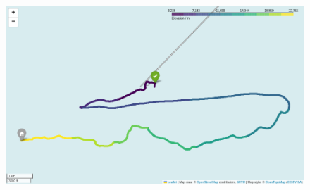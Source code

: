 \documentclass[11pt,a4paper,faculty=we,language=en,doctype=report]{cls/ugent-doc}
\begin{document}
\begin{figure}
	\includegraphics[width=\textwidth]{WeatherBalloonPath.png}
\end{figure}

\newpage


\end{document}
